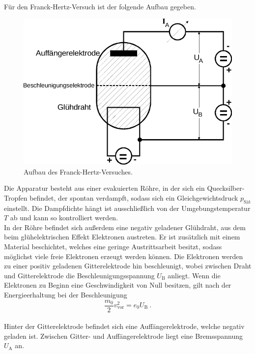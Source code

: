     Für den Franck-Hertz-Versuch ist der folgende Aufbau gegeben.
    \begin{figure}[H]
        \centering
        \includegraphics[scale=0.8]{content/img/Abb_1.pdf}
        \caption{Aufbau des Franck-Hertz-Versuches.}
        \label{fig:aufbau}
    \end{figure}
    Die Apparatur besteht aus einer evakuierten Röhre,
    in der sich ein Quecksilber-Tropfen befindet,
    der spontan verdampft,
    sodass sich ein Gleichgewichtsdruck $p_\text{Sät}$ einstellt.
    Die Dampfdichte hängt ist ausschließlich von der Umgebungstemperatur $T$ ab und kann so kontrolliert werden.\\
    In der Röhre befindet sich außerdem eine negativ geladener Glühdraht,
    aus dem beim glühelektrischen Effekt Elektronen austreten.
    Er ist zusätzlich mit einem Material beschichtet,
    welches eine geringe Austrittsarbeit besitzt,
    sodass möglichst viele freie Elektronen erzeugt werden können.
    Die Elektronen werden zu einer positiv geladenen Gitterelektrode hin beschleunigt,
    wobei zwischen Draht und Gitterelektrode die Beschleunigungsspannung $U_\text{B}$ anliegt.
    Wenn die Elektronen zu Beginn eine Geschwindigkeit von Null besitzen,
    gilt nach der Energieerhaltung bei der Beschleunigung
    \begin{equation*}
        \frac{m_0}{2}v^2_\text{vor} = e_0 U_\text{B} \ .
    \end{equation*}
    \\
    Hinter der Gitterelektrode befindet sich eine Auffängerelektrode,
    welche negativ geladen ist.
    Zwischen Gitter- und Auffängerelektrode liegt eine Bremsspannung $U_\text{A}$ an.
